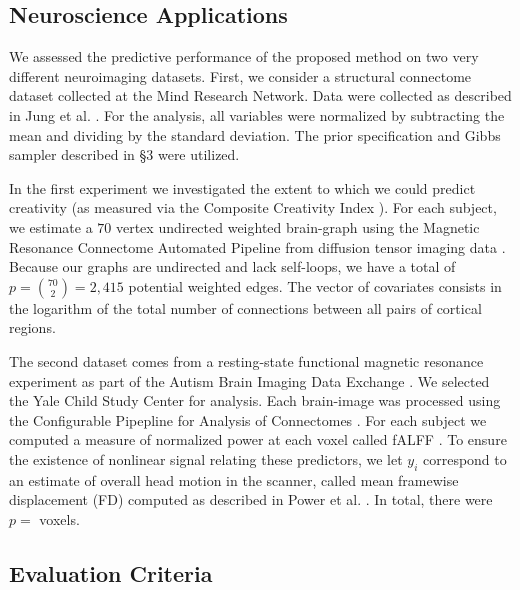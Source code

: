 


\subsection{Neuroscience Applications}

We assessed the predictive performance of the proposed method on two very different neuroimaging datasets. First, we consider a structural connectome dataset collected at the Mind Research Network.  Data were collected as described in Jung et al. \cite{Jung2010}. For the analysis, all variables were normalized by subtracting the mean and dividing by the standard deviation. The  prior specification and Gibbs sampler described in \S 3 were utilized. 

In the first experiment we investigated the extent to which we could predict creativity (as measured via the Composite Creativity Index \cite{Arden2010}).   For each subject, we estimate a $70$ vertex undirected weighted brain-graph using the Magnetic Resonance Connectome Automated Pipeline \cite{MRCAP11} from diffusion tensor imaging data \cite{Mori2006}. Because our graphs are undirected and lack self-loops, we have a total of $p=\binom{70}{2}=2,415$ potential weighted edges. The vector of covariates consists in the logarithm of the total number of connections between all pairs of cortical regions. 

The second dataset comes from a resting-state functional magnetic resonance experiment as part of the Autism Brain Imaging Data Exchange \cite{Autism}.  We selected the Yale Child Study Center for analysis.  Each brain-image was processed using the Configurable Pipepline for Analysis of Connectomes \cite{cpac}. For each subject we computed a measure of normalized power at each voxel called fALFF \cite{Zou2008}.  To ensure the existence of nonlinear signal relating these predictors, we let $y_i$ correspond to an estimate of overall head motion in the scanner, called mean framewise displacement (FD) computed as described in Power et al. \cite{power}. In total, there were $p=$ voxels.

\subsection{Evaluation Criteria}

